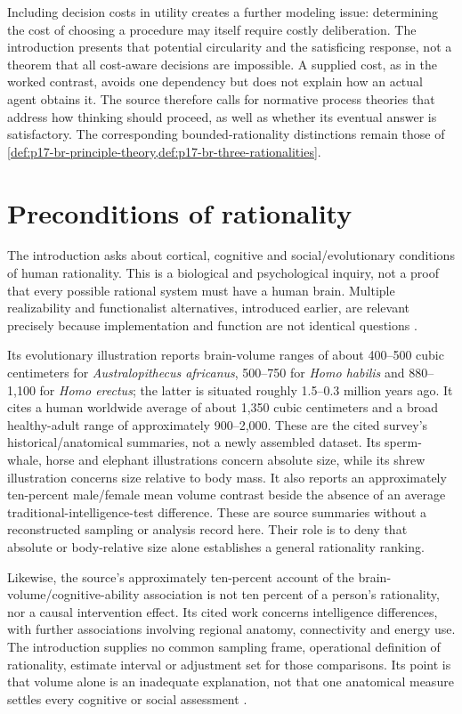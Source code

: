 Including decision costs in utility creates a further modeling issue:
determining the cost of choosing a procedure may itself require costly
deliberation. The introduction presents that potential circularity and
the satisficing response, not a theorem that all cost-aware decisions
are impossible. A supplied cost, as in the worked contrast, avoids
one dependency but does not explain how an actual agent obtains it.
The source therefore calls for normative process theories that address
how thinking should proceed, as well as whether its eventual answer
is satisfactory. The corresponding bounded-rationality distinctions
remain those of \cref{def:p17-br-principle-theory,def:p17-br-three-rationalities}.

\section{Preconditions of rationality}
\label{sec:p11-ri-preconditions}

The introduction asks about cortical, cognitive and social/evolutionary
conditions of human rationality. This is a biological and psychological
inquiry, not a proof that every possible rational system must have a
human brain. Multiple realizability and functionalist alternatives,
introduced earlier, are relevant precisely because implementation and
function are not identical questions
\cite[pp.~34--44]{KnauffSpohn2021FrameworksIntro}.

Its evolutionary illustration reports brain-volume ranges of about
400--500 cubic centimeters for \emph{Australopithecus africanus},
500--750 for \emph{Homo habilis} and 880--1,100 for
\emph{Homo erectus}; the latter is situated roughly 1.5--0.3 million
years ago. It cites a human worldwide average of about 1,350 cubic
centimeters and a broad healthy-adult range of approximately 900--2,000.
These are the cited survey's historical/anatomical summaries, not a
newly assembled dataset. Its sperm-whale, horse and elephant illustrations
concern absolute size, while its shrew illustration concerns size
relative to body mass. It also reports an approximately ten-percent
male/female mean volume contrast beside the absence of an average
traditional-intelligence-test difference. These are source summaries
without a reconstructed sampling or analysis record here. Their role
is to deny that absolute or body-relative size alone establishes
a general rationality ranking.

Likewise, the source's approximately ten-percent account of the
brain-volume/cognitive-ability association is not ten percent of a
person's rationality, nor a causal intervention effect. Its cited
work concerns intelligence differences, with further associations
involving regional anatomy, connectivity and energy use. The
introduction supplies no common sampling frame, operational definition
of rationality, estimate interval or adjustment set for those
comparisons. Its point is that volume alone is an inadequate explanation,
not that one anatomical measure settles every cognitive or social
assessment \cite[p.~35]{KnauffSpohn2021FrameworksIntro}.

